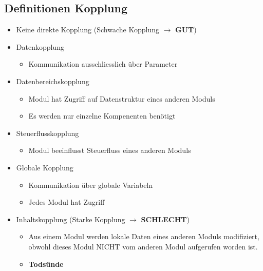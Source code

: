 \subsection{Definitionen Kopplung}
\begin{itemize}
  \item Keine direkte Kopplung (Schwache Kopplung $\rightarrow$ \textbf{GUT})
  \item Datenkopplung
  \begin{itemize}
    \item Kommunikation ausschliesslich über Parameter 
  \end{itemize}
  \item Datenbereichskopplung
   \begin{itemize}
    \item Modul hat Zugriff auf Datenstruktur eines anderen Moduls
    \item Es werden nur einzelne Kompenenten benötigt
  \end{itemize}
  \item Steuerflusskopplung
  \begin{itemize}
    \item Modul beeinflusst Steuerfluss eines anderen Moduls
  \end{itemize}
  \item Globale Kopplung
  \begin{itemize}
    \item Kommunikation über globale Variabeln
    \item Jedes Modul hat Zugriff
  \end{itemize}
  \item Inhaltskopplung (Starke Kopplung $\rightarrow$ \textbf{SCHLECHT})
  \begin{itemize}
    \item Aus einem Modul werden lokale Daten eines anderen Moduls modifiziert,
    obwohl dieses Modul NICHT vom anderen Modul aufgerufen worden ist. 
    \item \textbf{Todsünde}
  \end{itemize}
\end{itemize}
